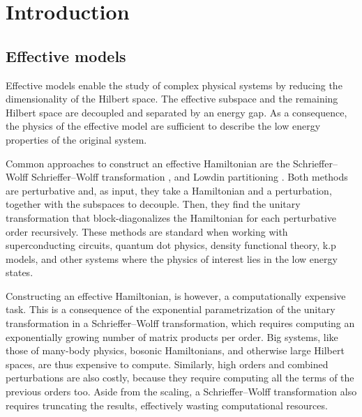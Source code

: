 \section{Introduction}

\subsection{Effective models}

Effective models enable the study of complex physical systems by reducing the
dimensionality of the Hilbert space.
The effective subspace and the remaining Hilbert space are decoupled and
separated by an energy gap.
As a consequence, the physics of the effective model are sufficient to describe
the low energy properties of the original system.

Common approaches to construct an effective Hamiltonian are the Schrieffer--Wolff
Schrieffer--Wolff transformation
\cite{Schrieffer_1966}, \cite{Bravyi_2011}
and Lowdin partitioning \cite{White_1950}.
Both methods are perturbative and, as input, they take a Hamiltonian and a
perturbation, together with the subspaces to decouple.
Then, they find the unitary transformation that block-diagonalizes the
Hamiltonian for each perturbative order recursively.
These methods are standard when working with superconducting circuits,
quantum dot physics, density functional theory, k.p models, and other
systems where the physics of interest lies in the low energy states.

Constructing an effective Hamiltonian, is however, a computationally expensive
task.
This is a consequence of the exponential parametrization of the unitary
transformation in a Schrieffer--Wolff transformation, which requires computing
an exponentially growing number of matrix products per order.
Big systems, like those of many-body physics, bosonic Hamiltonians, and
otherwise large Hilbert spaces, are thus expensive to compute.
Similarly, high orders and combined perturbations are also costly, because they
require computing all the terms of the previous orders too.
Aside from the scaling, a Schrieffer--Wolff transformation also requires
truncating the results, effectively wasting computational resources.

